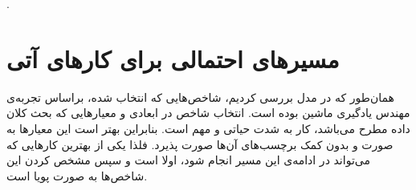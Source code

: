 
. 
\section{مسیر‌های احتمالی برای کار‌های آتی}

همان‌طور که در مدل بررسی کردیم، شاخص‌هایی که انتخاب شده، براساس تجربه‌ی مهندس یادگیری ماشین بوده است. انتخاب شاخص در ابعادی و معیارهایی که بحث کلان داده مطرح می‌باشد، کار به شدت حیاتی و مهم است. بنابراین بهتر است این معیارها به صورت 
و بدون کمک برچسب‌های آن‌ها صورت پذیرد. فلذا یکی از بهترین کارهایی که می‌تواند در ادامه‌ی این مسیر انجام شود، اولا
است و سپس مشخص کردن این شاخص‌ها به صورت پویا است.